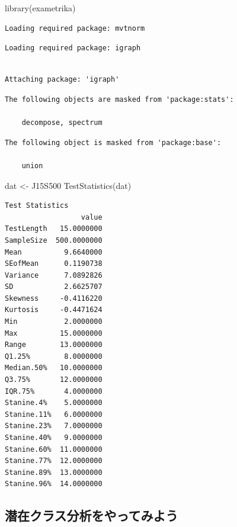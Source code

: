 \documentclass[
  a4paper,
]{ltjsbook}
\newenvironment{Shaded}{\begin{snugshade}}{\end{snugshade}}
\newcommand{\FunctionTok}[1]{\textcolor[rgb]{0.28,0.35,0.67}{#1}}
\newcommand{\NormalTok}[1]{\textcolor[rgb]{0.00,0.23,0.31}{#1}}
\newcommand{\OtherTok}[1]{\textcolor[rgb]{0.00,0.23,0.31}{#1}}
\begin{document}
\begin{Shaded}
\begin{Highlighting}[]
\FunctionTok{library}\NormalTok{(exametrika)}
\end{Highlighting}
\end{Shaded}

\begin{verbatim}
Loading required package: mvtnorm
\end{verbatim}

\begin{verbatim}
Loading required package: igraph
\end{verbatim}

\begin{verbatim}

Attaching package: 'igraph'
\end{verbatim}

\begin{verbatim}
The following objects are masked from 'package:stats':

    decompose, spectrum
\end{verbatim}

\begin{verbatim}
The following object is masked from 'package:base':

    union
\end{verbatim}

\begin{Shaded}
\begin{Highlighting}[]
\NormalTok{dat }\OtherTok{\textless{}{-}}\NormalTok{ J15S500}
\FunctionTok{TestStatistics}\NormalTok{(dat)}
\end{Highlighting}
\end{Shaded}

\begin{verbatim}
Test Statistics
                  value
TestLength   15.0000000
SampleSize  500.0000000
Mean          9.6640000
SEofMean      0.1190738
Variance      7.0892826
SD            2.6625707
Skewness     -0.4116220
Kurtosis     -0.4471624
Min           2.0000000
Max          15.0000000
Range        13.0000000
Q1.25%        8.0000000
Median.50%   10.0000000
Q3.75%       12.0000000
IQR.75%       4.0000000
Stanine.4%    5.0000000
Stanine.11%   6.0000000
Stanine.23%   7.0000000
Stanine.40%   9.0000000
Stanine.60%  11.0000000
Stanine.77%  12.0000000
Stanine.89%  13.0000000
Stanine.96%  14.0000000
\end{verbatim}

\subsection{潜在クラス分析をやってみよう}\label{ux6f5cux5728ux30afux30e9ux30b9ux5206ux6790ux3092ux3084ux3063ux3066ux307fux3088ux3046}
\end{document}
